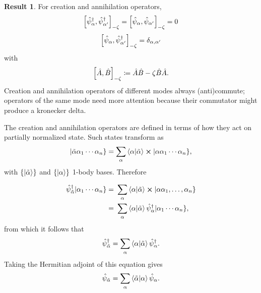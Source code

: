 \documentclass{article}
\theoremstyle{definition}
\newtheorem{res}[mot]{Result}
\numberwithin{equation}{section}
\begin{document}
\begin{graybox}
\begin{res}
    \label{res:commutators-of-creation-and-annihilation-operators}
    For creation and annihilation operators, 
    \begin{equation}
        \comm{\hat{\psi}^{\dagger}_{\alpha}}{\hat{\psi}^{\dagger}_{\alpha'}}
        _{-\zeta}
        =
        \comm{\hat{\psi}_{\alpha}}{\hat{\psi}_{\alpha'}}
        _{-\zeta}
        =0
    \end{equation}
    \begin{equation}
        \comm{\hat{\psi}_{\alpha}}{\hat{\psi}^{\dagger}_{\alpha'}}
        _{-\zeta}
        =
        \delta_{\alpha,\alpha'}
    \end{equation}
    with 
    \begin{equation}
    \comm{\hat{A}}{\hat{B}}_{-\zeta}
    \coloneqq
    \hat{A}\hat{B}-\zeta \hat{B} \hat{A}.
    \end{equation}
    Creation and annihilation operators 
    of different modes always (anti)commute; 
    operators of the same mode 
    need more attention because their commutator 
    might produce a kronecker delta.
\end{res}
\end{graybox}

The creation and annihilation operators 
are defined 
in terms of how they act on partially normalized state. 
Such states transform as 
\[
    |\tilde{\alpha} \alpha_1 \cdots \alpha_{n}\}
    =
    \sum_{\alpha}
    \bra{\alpha}\ket{\tilde{\alpha}}
    \cross 
    |\alpha \alpha_{1}\cdots \alpha_{n}\},
\]
with $\{\ket{\tilde{\alpha}}\}$ and $\{\ket{\alpha}\}$
1-body bases. Therefore

\begin{align*}
    \hat{\psi}^{\dagger}_{\tilde{\alpha}}
    |\alpha_1\cdots \alpha_{n}\}
    =&\ 
    \sum_{\alpha}\bra{\alpha}\ket{\tilde{\alpha}}
    \cross 
    |\alpha \alpha_1, \ldots ,\alpha_{n}\} \\
    =&\ 
    \sum_{\alpha}\bra{\alpha}\ket{\tilde{\alpha}}
    \hat{\psi}^{\dagger}_{\alpha}
    |\alpha_1\cdots \alpha_{n}\},
\end{align*}
from which it follows that 
\[
    \hat{\psi}^{\dagger}_{\tilde{\alpha}}
    =
    \sum_{\alpha}\bra{\alpha}\ket{\tilde{\alpha}}
    \hat{\psi}^{\dagger}_{\alpha}.
\]
Taking the Hermitian adjoint of this equation gives 
\[
    \hat{\psi}_{\tilde{\alpha}}
    =
    \sum_{\alpha}
    \bra{\tilde{\alpha}}\ket{\alpha}
    \hat{\psi}_{\alpha}.
\]
\end{document}
